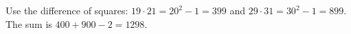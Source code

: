 Use the difference of squares: $19\cdot21=20^2-1=399$ and $29\cdot31=30^2-1=899$. The sum is $400+900-2=\boxed{1298}$.
